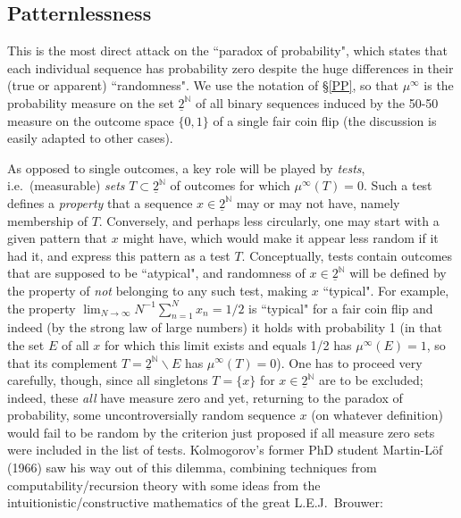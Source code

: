 \documentclass[12pt]{article}
\numberwithin{equation}{section}
\newcommand{\ul}{\underline}
\newcommand{\raw}{\rightarrow}
\newcommand{\inv}{^{-1}}
\newcommand{\N}{{\mathbb N}} \newcommand{\R}{{\mathbb R}}
\begin{document}
\subsection*{Patternlessness}
This is the most direct attack on the ``paradox of probability", which states that each individual sequence has probability zero despite the huge differences in their (true or apparent) ``randomness".  We use the notation of \S\ref{PP}, so that $\mu^{\infty}$ is the probability measure on the set $\ul{2}^{\N}$ of all binary sequences induced by the 50-50 measure on the outcome space $\{0,1\}$ of a single fair coin flip (the discussion is easily adapted to other cases).

As opposed to single outcomes, a key role will be played by \emph{tests}, i.e.\ (measurable) \emph{sets} $T\subset \ul{2}^{\N}$ of outcomes for which $\mu^{\infty}(T)=0$. Such a test defines a \emph{property} that a sequence $x\in \ul{2}^{\N}$ may or may not have, namely membership of $T$. Conversely, and perhaps less circularly, one may start with a given pattern that $x$ might have, which would make it appear less random if it had it, and express this pattern as a test $T$. Conceptually, tests contain outcomes that are supposed to be ``atypical", and randomness of $x\in \ul{2}^{\N}$ will be defined by the property of \emph{not} belonging to any such test, making $x$ ``typical".  For example, the property
$\lim_{N\raw\infty}  N\inv  \sum_{n=1}^N x_n=1/2$ is ``typical" for a fair coin flip and indeed (by the strong law of large numbers) it holds with probability 1 (in that the set $E$ of all $x$ for which this limit exists and equals 1/2 has $\mu^{\infty}(E)=1$, so that its complement $T=\ul{2}^{\N}\backslash E$ has $\mu^{\infty}(T)=0$).
One has to proceed very carefully, though, since all singletons  $T=\{x\}$ for  $x\in  \ul{2}^{\N}$ are to be excluded; indeed, these \emph{all} have measure zero and yet, returning to the paradox of probability, some uncontroversially  random sequence $x$ (on whatever definition) would fail to be random by the criterion just proposed if all measure zero sets were included in the list of tests. Kolmogorov's former PhD student Martin-L\"{o}f (1966) saw his way out of
 this dilemma, combining techniques from computability/recursion theory with some ideas from the intuitionistic/constructive mathematics of the great L.E.J.\ Brouwer:
\end{document}
